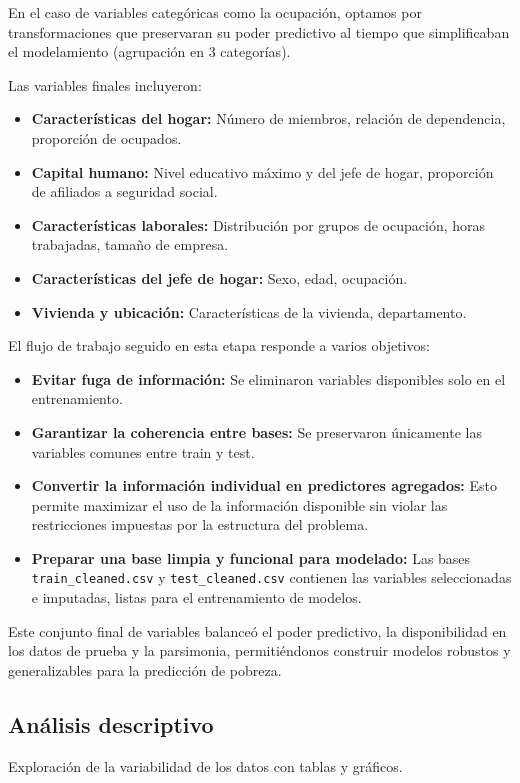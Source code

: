 \documentclass[12pt,a4paper,onecolumn]{article}
\begin{document}
En el caso de variables categóricas como la ocupación, optamos por transformaciones que preservaran su poder predictivo al tiempo que simplificaban el modelamiento (agrupación en 3 categorías).

Las variables finales incluyeron:
\begin{itemize}
    \item \textbf{Características del hogar:} Número de miembros, relación de dependencia, proporción de ocupados.
    \item \textbf{Capital humano:} Nivel educativo máximo y del jefe de hogar, proporción de afiliados a seguridad social.
    \item \textbf{Características laborales:} Distribución por grupos de ocupación, horas trabajadas, tamaño de empresa.
    \item \textbf{Características del jefe de hogar:} Sexo, edad, ocupación.
    \item \textbf{Vivienda y ubicación:} Características de la vivienda, departamento.
\end{itemize}

El flujo de trabajo seguido en esta etapa responde a varios objetivos:

\begin{itemize}
    \item \textbf{Evitar fuga de información:} Se eliminaron variables disponibles solo en el entrenamiento.
    \item \textbf{Garantizar la coherencia entre bases:} Se preservaron únicamente las variables comunes entre train y test.
    \item \textbf{Convertir la información individual en predictores agregados:} Esto permite maximizar el uso de la información disponible sin violar las restricciones impuestas por la estructura del problema.
    \item \textbf{Preparar una base limpia y funcional para modelado:} Las bases \texttt{train\_cleaned.csv} y \texttt{test\_cleaned.csv} contienen las variables seleccionadas e imputadas, listas para el entrenamiento de modelos.
\end{itemize}

Este conjunto final de variables balanceó el poder predictivo, la disponibilidad en los datos de prueba y la parsimonia, permitiéndonos construir modelos robustos y generalizables para la predicción de pobreza.

\subsection{Análisis descriptivo}
Exploración de la variabilidad de los datos con tablas y gráficos.
\end{document}
